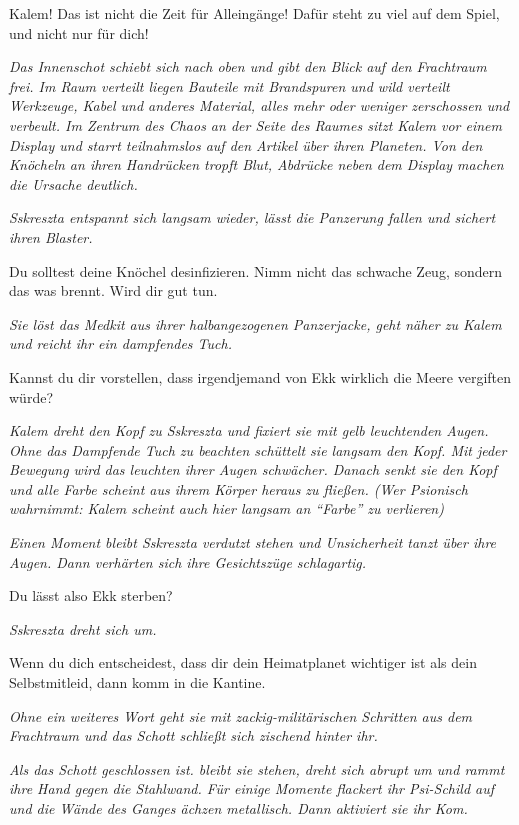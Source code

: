 \documentclass[11pt]{scrartcl}
\begin{document}
Kalem! Das ist nicht die Zeit für Alleingänge! Dafür steht zu viel auf
dem Spiel, und nicht nur für dich!

\emph{Das Innenschot schiebt sich nach oben und gibt den Blick auf den
Frachtraum frei. Im Raum verteilt liegen Bauteile mit Brandspuren und
wild verteilt Werkzeuge, Kabel und anderes Material, alles mehr oder
weniger zerschossen und verbeult. Im Zentrum des Chaos an der Seite des
Raumes sitzt Kalem vor einem Display und starrt teilnahmslos auf den
Artikel über ihren Planeten. Von den Knöcheln an ihren Handrücken tropft
Blut, Abdrücke neben dem Display machen die Ursache deutlich.}

\emph{Sskreszta entspannt sich langsam wieder, lässt die Panzerung
fallen und sichert ihren Blaster.}

Du solltest deine Knöchel desinfizieren. Nimm nicht das schwache Zeug,
sondern das was brennt. Wird dir gut tun.

\emph{Sie löst das Medkit aus ihrer halbangezogenen Panzerjacke, geht
näher zu Kalem und reicht ihr ein dampfendes Tuch.}

Kannst du dir vorstellen, dass irgendjemand von Ekk wirklich die Meere
vergiften würde?

\emph{Kalem dreht den Kopf zu Sskreszta und fixiert sie mit gelb
leuchtenden Augen. Ohne das Dampfende Tuch zu beachten schüttelt sie
langsam den Kopf. Mit jeder Bewegung wird das leuchten ihrer Augen
schwächer. Danach senkt sie den Kopf und alle Farbe scheint aus ihrem
Körper heraus zu fließen. (Wer Psionisch wahrnimmt: Kalem scheint auch
hier langsam an ``Farbe'' zu verlieren)}

\emph{Einen Moment bleibt Sskreszta verdutzt stehen und Unsicherheit
tanzt über ihre Augen. Dann verhärten sich ihre Gesichtszüge
schlagartig.}

Du lässt also Ekk sterben?

\emph{Sskreszta dreht sich um.}

Wenn du dich entscheidest, dass dir dein Heimatplanet wichtiger ist als
dein Selbstmitleid, dann komm in die Kantine.

\emph{Ohne ein weiteres Wort geht sie mit zackig-militärischen Schritten
aus dem Frachtraum und das Schott schließt sich zischend hinter ihr.}

\emph{Als das Schott geschlossen ist. bleibt sie stehen, dreht sich
abrupt um und rammt ihre Hand gegen die Stahlwand. Für einige Momente
flackert ihr Psi-Schild auf und die Wände des Ganges ächzen metallisch.
Dann aktiviert sie ihr Kom.}
\end{document}
